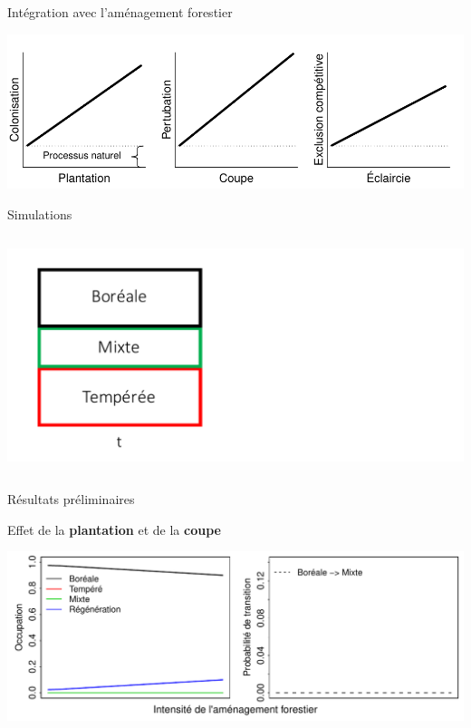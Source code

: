 \documentclass[11pt, compress, aspectratio=1610]{beamer}
\newcommand{\begincols}{\begin{columns}}
\newcommand{\stopcols}{\end{columns}}
\begin{document}
\begin{frame}{Intégration avec l’aménagement forestier}
\protect\hypertarget{intuxe9gration-avec-lamuxe9nagement-forestier}{}

\centering

\includegraphics[scale=0.65]{figures/managMechanism.pdf}

\par

\end{frame}

\begin{frame}{Simulations}
\protect\hypertarget{simulations}{}

\begincols
{}

\includegraphics[scale=0.50]{figures/migration0.pdf}
\hfill{}  \stopcols

\end{frame}

\begin{frame}{Résultats préliminaires}
\protect\hypertarget{ruxe9sultats-pruxe9liminaires}{}

Effet de la \textbf{plantation} et de la \textbf{coupe}

\centering

\includegraphics[scale=0.65]{figures/result0.pdf}

\par

\end{frame}
\end{document}
